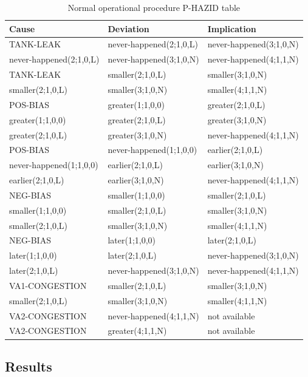 \documentclass[conference]{IEEEtran}
\begin{document}
\begin{table}
\centering
\label{tab:normalophazid}
\begin{tabular}{|l|l|l|}
\hline
Cause & Deviation & Implication \\
\hline
TANK-LEAK & never-happened(2;1,0,L) & never-happened(3;1,0,N) \\
never-happened(2;1,0,L) & never-happened(3;1,0,N) & never-happened(4;1,1,N) \\
TANK-LEAK & smaller(2;1,0,L) & smaller(3;1,0,N) \\
smaller(2;1,0,L) & smaller(3;1,0,N) & smaller(4;1,1,N) \\
POS-BIAS & greater(1;1,0,0) & greater(2;1,0,L) \\
greater(1;1,0,0) & greater(2;1,0,L) & greater(3;1,0,N) \\
greater(2;1,0,L) & greater(3;1,0,N) & never-happened(4;1,1,N) \\
POS-BIAS & never-happened(1;1,0,0) & earlier(2;1,0,L) \\
never-happened(1;1,0,0) & earlier(2;1,0,L) & earlier(3;1,0,N) \\
earlier(2;1,0,L) & earlier(3;1,0,N) & never-happened(4;1,1,N) \\
NEG-BIAS & smaller(1;1,0,0) & smaller(2;1,0,L) \\
smaller(1;1,0,0) & smaller(2;1,0,L) & smaller(3;1,0,N) \\
smaller(2;1,0,L) & smaller(3;1,0,N) & smaller(4;1,1,N) \\
NEG-BIAS & later(1;1,0,0) & later(2;1,0,L) \\
later(1;1,0,0) & later(2;1,0,L) & never-happened(3;1,0,N) \\
later(2;1,0,L) & never-happened(3;1,0,N) & never-happened(4;1,1,N) \\
VA1-CONGESTION & smaller(2;1,0,L) & smaller(3;1,0,N) \\
smaller(2;1,0,L) & smaller(3;1,0,N) & smaller(4;1,1,N) \\
VA2-CONGESTION & never-happened(4;1,1,N) & not available \\
VA2-CONGESTION & greater(4;1,1,N) & not available \\
\hline
\end{tabular}
\caption{Normal operational procedure P-HAZID table}
\end{table}

\subsection{Results}
\end{document}
